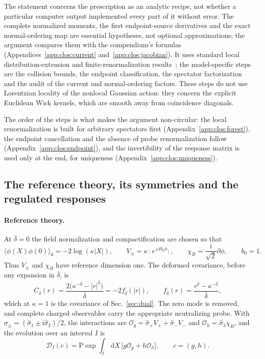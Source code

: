 \documentclass[11pt,a4paper]{article}
\numberwithin{equation}{section}
\newcommand{\dd}{\,\mathrm d}
\newcommand{\db}{\bar\delta}
\newcommand{\Og}{\mathcal O_g}
\newcommand{\Oh}{\mathcal O_h}
\begin{document}
The statement concerns the prescription as an analytic recipe, not whether a particular computer output implemented
every part of it without error. The complete normalized moments, the first endpoint-source derivatives and the exact
normal-ordering map are essential hypotheses, not optional approximations; the argument compares them with the
compendium's formulas (Appendices~\ref{app:clos:current} and~\ref{app:clos:jacobian}). It uses standard local
distribution-extension and finite-renormalization results~\cite{Brunetti:2000,Brunetti:2009}; the model-specific
steps are the collision bounds, the endpoint classification, the spectator factorization and the audit of the
current and normal-ordering factors. These steps do not use Lorentzian locality of the nonlocal Gaussian action: they
concern the explicit Euclidean Wick kernels, which are smooth away from coincidence diagonals.

The order of the steps is what makes the argument non-circular: the local renormalization is built for arbitrary
spectators first (Appendix~\ref{app:clos:forest}), the endpoint cancellation and the absence of probe renormalization
follow (Appendix~\ref{app:clos:endpoint}), and the invertibility of the response matrix is used only at the end, for
uniqueness (Appendix~\ref{app:clos:uniqueness}).

\subsection{The reference theory, its symmetries and the regulated responses}\label{app:clos:reference}
\paragraph{Reference theory.} At $\db=0$ the field normalization and compactification are chosen so that
\begin{equation}
 \langle\phi(X)\phi(0)\rangle_0=-2\log(\kappa|X|),\qquad
 V_\pm=\kappa\,{:}e^{\pm\mathrm i b_0\phi}{:},\qquad
 \chi_B=\frac{\mathrm i}{\sqrt2}\partial\phi,\qquad b_0=1.
 \label{eq:clos:reference}
\end{equation}
Thus $V_\pm$ and $\chi_B$ have reference dimension one. The deformed covariance, before any expansion in $\db$, is
\begin{equation}
 C_{\db}(r)=\frac{2\bigl(\kappa^{-\db}-|r|^{\db}\bigr)}{\db}=-2f_{\db}(|r|),\qquad
 f_{\db}(r)=\frac{r^{\db}-\kappa^{-\db}}{\db},
 \label{eq:clos:cov}
\end{equation}
which at $\kappa=1$ is the covariance of Sec.~\ref{sec:dual}. The zero mode is removed, and complete charged
observables carry the appropriate neutralizing probe. With $\hat\sigma_\pm=(\hat\sigma_1\pm\mathrm i\hat\sigma_2)/2$,
the interactions are $\Og=\hat\sigma_+V_++\hat\sigma_-V_-$ and $\Oh=\hat\sigma_3\chi_B$, and the evolution over an
interval $I$ is
\begin{equation}
 \mathcal D_I(c)=\mathrm P\exp\int_I\dd X\,\bigl[g\Og+h\Oh\bigr],\qquad c=(g,h).
 \label{eq:clos:interaction}
\end{equation}
\end{document}
